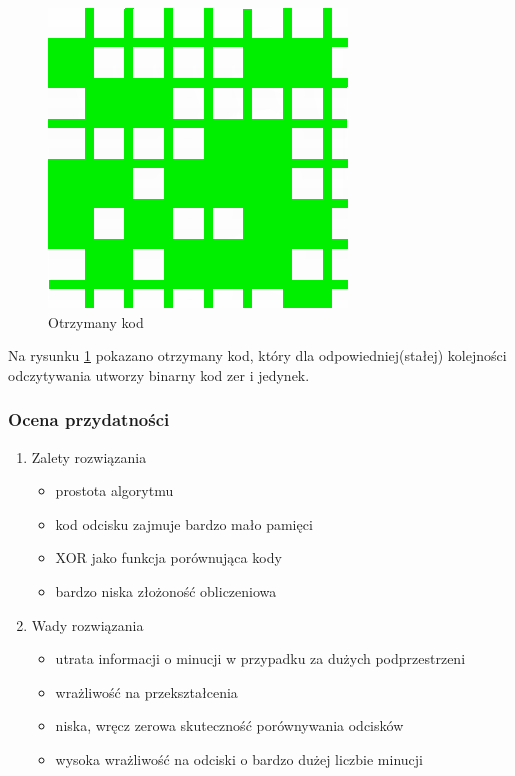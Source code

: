 \begin{figure}[hbt]
    \begin{center}
	\includegraphics[angle=0,scale=1]{img/simple_crate_code.jpg}
	\caption{Otrzymany kod}
	\label{simple_code}
    \end{center}
\end{figure}
Na rysunku \ref{simple_code} pokazano otrzymany kod, który dla odpowiedniej(stałej) kolejności odczytywania utworzy binarny kod zer i jedynek.

\subsubsection{Ocena przydatności}
\begin{enumerate}
\item Zalety rozwiązania
\renewcommand*{\labelitemi}{\bullet}
\begin{itemize}
\item prostota algorytmu
\item kod odcisku zajmuje bardzo mało pamięci
\item XOR jako funkcja porównująca kody
\item bardzo niska złożoność obliczeniowa
\end{itemize}
\item Wady rozwiązania
\renewcommand*{\labelitemi}{\bullet}
\begin{itemize}
\item utrata informacji o minucji w przypadku za dużych podprzestrzeni
\item wrażliwość na przekształcenia
\item niska, wręcz zerowa skuteczność porównywania odcisków
\item wysoka wrażliwość na odciski o bardzo dużej liczbie minucji
\end{itemize}
\end{enumerate}

